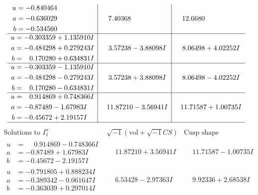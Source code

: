 \documentclass[1p]{elsarticle_modified}
\theoremstyle{definition}
\newcommand{\I}{\sqrt{-1}}
\begin{document}
$$\begin{array}{c|c|c}
\begin{aligned}
u &= -0.840464\phantom{ +0.000000I} \\
a &= -0.636029\phantom{ +0.000000I} \\
b &= -0.534560\phantom{ +0.000000I}\end{aligned}
 & \phantom{-}7.40368\phantom{ +0.000000I} & \phantom{-}12.6680\phantom{ +0.000000I} \\ \hline\begin{aligned}
u &= -0.303359 + 1.135910 I \\
a &= -0.484298 + 0.279243 I \\
b &= \phantom{-}0.170280 + 0.634831 I\end{aligned}
 & \phantom{-}3.57238 - 3.88098 I & \phantom{-}8.06498 + 4.02252 I \\ \hline\begin{aligned}
u &= -0.303359 - 1.135910 I \\
a &= -0.484298 - 0.279243 I \\
b &= \phantom{-}0.170280 - 0.634831 I\end{aligned}
 & \phantom{-}3.57238 + 3.88098 I & \phantom{-}8.06498 - 4.02252 I \\ \hline\begin{aligned}
u &= \phantom{-}0.914869 + 0.748366 I \\
a &= -0.87489 - 1.67983 I \\
b &= -0.45672 + 2.19157 I\end{aligned}
 & \phantom{-}11.87210 - 3.56941 I & \phantom{-}11.71587 + 1.00735 I\\
 \hline 
 \end{array}$$\newpage$$\begin{array}{c|c|c}  
\text{Solutions to }I^u_{1}& \I (\text{vol} + \sqrt{-1}CS) & \text{Cusp shape}\\
 \hline 
\begin{aligned}
u &= \phantom{-}0.914869 - 0.748366 I \\
a &= -0.87489 + 1.67983 I \\
b &= -0.45672 - 2.19157 I\end{aligned}
 & \phantom{-}11.87210 + 3.56941 I & \phantom{-}11.71587 - 1.00735 I \\ \hline\begin{aligned}
u &= -0.791805 + 0.888234 I \\
a &= -0.389342 - 0.061647 I \\
b &= -0.363039 + 0.297014 I\end{aligned}
 & \phantom{-}6.53428 - 2.97363 I & \phantom{-}9.92336 + 2.68538 I \\ \hline\begin{aligned}

\end{aligned}
\end{array}$$
\end{document}
